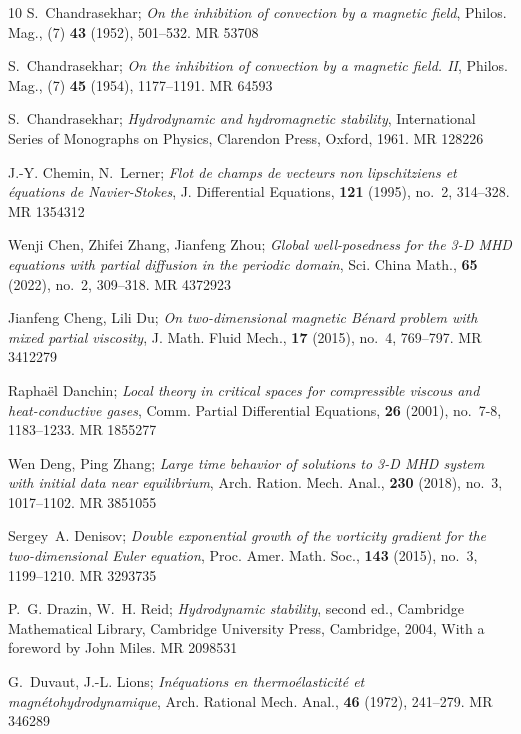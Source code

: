 \documentclass[reqno]{amsart}
\begin{document}
\begin{thebibliography}{10}
S.~Chandrasekhar; 
\emph{On the inhibition of convection by a magnetic field},
 Philos. Mag., (7) \textbf{43} (1952), 501--532. MR {53708}

S.~Chandrasekhar; 
\emph{On the inhibition of convection by a magnetic field. {II}},
 Philos. Mag., (7) \textbf{45} (1954), 1177--1191. MR {64593}

S.~Chandrasekhar; 
\emph{Hydrodynamic and hydromagnetic stability}, International Series
 of Monographs on Physics, Clarendon Press, Oxford, 1961. MR {128226}

J.-Y. Chemin, N.~Lerner; 
\emph{Flot de champs de vecteurs non lipschitziens
 et \'equations de {N}avier-{S}tokes}, J. Differential Equations,
 \textbf{121} (1995), no.~2, 314--328. MR {1354312}

Wenji Chen, Zhifei Zhang, Jianfeng Zhou; 
\emph{Global well-posedness for
 the 3-{D} {MHD} equations with partial diffusion in the periodic domain},
 Sci. China Math., \textbf{65} (2022), no.~2, 309--318. MR {4372923}

Jianfeng Cheng, Lili Du; 
\emph{On two-dimensional magnetic {B}\'enard
 problem with mixed partial viscosity}, J. Math. Fluid Mech., \textbf{17}
 (2015), no.~4, 769--797. MR {3412279}

Rapha\"{e}l Danchin; 
\emph{Local theory in critical spaces for compressible
 viscous and heat-conductive gases}, Comm. Partial Differential Equations,
 \textbf{26} (2001), no.~7-8, 1183--1233. MR {1855277}

Wen Deng, Ping Zhang; 
\emph{Large time behavior of solutions to 3-{D} {MHD}
 system with initial data near equilibrium}, Arch. Ration. Mech. Anal.,
 \textbf{230} (2018), no.~3, 1017--1102. MR {3851055}

Sergey~A. Denisov; 
\emph{Double exponential growth of the vorticity gradient
 for the two-dimensional {E}uler equation}, Proc. Amer. Math. Soc.,
 \textbf{143} (2015), no.~3, 1199--1210. MR {3293735}

P.~G. Drazin, W.~H. Reid; 
\emph{Hydrodynamic stability}, second ed.,
 Cambridge Mathematical Library, Cambridge University Press, Cambridge, 2004,
 With a foreword by John Miles. MR {2098531}

G.~Duvaut, J.-L. Lions; 
\emph{In\'equations en thermo\'elasticit\'e et
 magn\'etohydrodynamique}, Arch. Rational Mech. Anal., \textbf{46} (1972),
 241--279. MR {346289}


\end{thebibliography}
\end{document}
